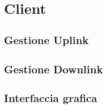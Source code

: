 \section{Client}

\subsection{Gestione Uplink}


\subsection{Gestione Downlink}


\subsection{Interfaccia grafica}
















